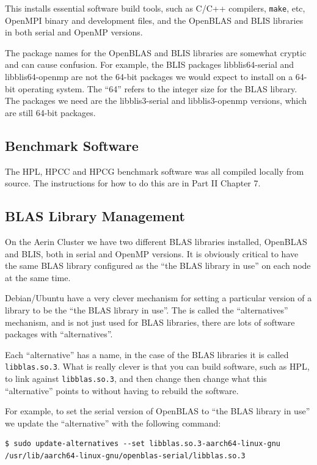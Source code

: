 \documentclass{report}
\begin{document}
This installs essential software build tools, such as C/C++ compilers, \verb|make|, etc, OpenMPI binary and development files, and the OpenBLAS and BLIS libraries in both serial and OpenMP versions. 

The package names for the OpenBLAS and BLIS libraries are somewhat cryptic and can cause confusion. For example, the BLIS packages libblis64-serial and libblis64-openmp are not the 64-bit packages we would expect to install on a 64-bit operating system. The ``64'' refers to the integer size for the BLAS library. The packages we need are the libblis3-serial and libblis3-openmp versions, which are still 64-bit packages.


%
%
\subsection{Benchmark Software}

The HPL, HPCC and HPCG benchmark software was all compiled locally from source. The instructions for how to do this are in Part II Chapter 7.


%
%
\subsection{BLAS Library Management}

On the Aerin Cluster we have two different BLAS libraries installed, OpenBLAS and BLIS, both in serial and OpenMP versions. It is obviously critical to have the same BLAS library configured as the ``the BLAS library in use'' on each node at the same time.

Debian/Ubuntu have a very clever mechanism for setting a particular version of a library to be the ``the BLAS library in use''. The is called the ``alternatives'' mechanism, and is not just used for BLAS libraries, there are lots of software packages with ``alternatives''.

Each ``alternative'' has a name, in the case of the BLAS libraries it is called \verb|libblas.so.3|. What is really clever is that you can build software, such as HPL, to link against \verb|libblas.so.3|, and then change then change what this ``alternative'' points to without having to rebuild the software.

For example, to set the serial version of OpenBLAS to ``the BLAS library in use'' we update the ``alternative'' with the following command:

\lstset{style=type}
\begin{lstlisting}
$ sudo update-alternatives --set libblas.so.3-aarch64-linux-gnu /usr/lib/aarch64-linux-gnu/openblas-serial/libblas.so.3
\end{lstlisting}
\end{document}
